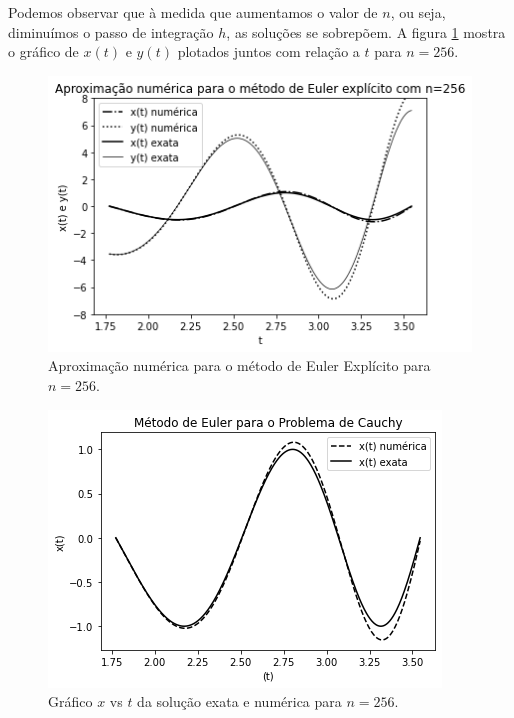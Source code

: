 \documentclass[amsmath,amssymb,floatfix]{revtex4}
\begin{document}
Podemos observar que à medida que aumentamos o valor de $n$, ou seja, diminuímos o passo de integração $h$, as soluções se sobrepõem. A figura \ref{exatanumE} mostra o gráfico de $x(t)$ e $y(t)$ plotados juntos com relação a $t$ para $n=256$. 
\begin{figure}[H]
\centering
\includegraphics[scale=0.56]{exata_num_x_y}
\caption{Aproximação numérica para o método de Euler Explícito para $n=256$.}
\label{exatanumE}
\end{figure}

\begin{figure}[H]
\centering
\includegraphics[scale=0.56]{eulerx_num_exata}
\caption{Gráfico $x$ vs $t$ da solução exata e numérica para $n=256$.}
\label{eulerx}
\end{figure}
\end{document}
